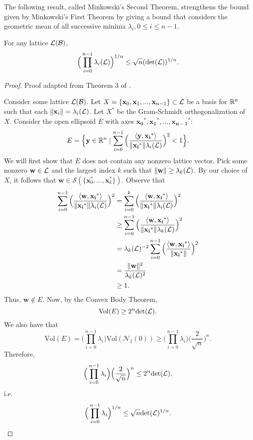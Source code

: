 \documentclass[a4paper,12pt]{article}
\begin{document}
The following result, called Minkowski's Second Theorem, strengthens the bound given by Minkowski's First Theorem by giving a bound that considers the geometric mean of all successive minima $\lambda_i, 0\leq i\leq n-1$.

\begin{thm}
    For any lattice $\mathcal{L}(\mathcal{B})$, $$\Big(\prod_{i=0}^{n-1}\lambda_{i}(\mathcal{L})\Big)^{1/n} \leq \sqrt{n}(\text{det}(\mathcal{L}))^{1/n}.$$
\end{thm}

\begin{proof}
    Proof adapted from Theorem 3 of \cite{RegevIntro}.
    
    Consider some lattice $\mathcal{L}(\mathcal{B})$. Let $X = \lbrace\mathbf{x}_0, \mathbf{x}_1, ..., \mathbf{x}_{n-1}\rbrace \subset \mathcal{L}$ be a basis for $\mathbb{R}^n$ such that each $\|\mathbf{x}_{i}\| = \lambda_{i}(\mathcal{L})$. Let $X^*$ be the Gram-Schmidt orthogonalization of $X$. Consider the open ellipsoid $E$ with axes $\mathbf{x_0}^{*}, \mathbf{x_1}^{*}, ..., \mathbf{x_{n-1}}^{*}$: $$E = \Big\lbrace \mathbf{y} \in \mathbb{R}^n \mid \sum_{i=0}^{n-1}\Big(\frac{\langle\mathbf{y},\mathbf{x_i}^*\rangle}{\|\mathbf{x_i}^{*}\|\lambda_{i}(\mathcal{L})}\Big)^{2} < 1  \Big\rbrace.$$
    We will first show that $E$ does not contain any nonzero lattice vector. Pick some nonzero $\mathbf{w} \in \mathcal{L}$ and the largest index $k$ such that $\|\mathbf{w}\| \geq \lambda_{k}(\mathcal{L})$. By our choice of $X$, it follows that $\mathbf{w} \in \mathcal{S}(\lbrace\mathbf{x}_{0}^{*},...,\mathbf{x}_{k}^{*}\rbrace)$. Observe that \begin{align*}
        \sum_{i=0}^{n-1}\Big(\frac{\langle\mathbf{w},\mathbf{x_i}^*\rangle}{\|\mathbf{x_i}^{*}\|\lambda_{i}(\mathcal{L})}\Big)^{2} &= \sum_{i=0}^{k}\Big(\frac{\langle\mathbf{w},\mathbf{x_i}^*\rangle}{\|\mathbf{x_i}^{*}\|\lambda_{i}(\mathcal{L})}\Big)^{2} \\
        &\geq \sum_{i=0}^{n-1}\Big(\frac{\langle\mathbf{w},\mathbf{x_i}^*\rangle}{\|\mathbf{x_i}^{*}\|\lambda_{k}(\mathcal{L})}\Big)^{2} \\ 
        &= \lambda_{k}(\mathcal{L})^{-2}\sum_{i=0}^{n-1}\Big(\frac{\langle\mathbf{w},\mathbf{x_i}^*\rangle}{\|\mathbf{x_i}^{*}\|}\Big)^{2} \\
        &= \frac{\|\mathbf{w}\|^{2}}{\lambda_{k}(\mathcal{L})^{2}} \\
        &\geq 1.
    \end{align*}
    Thus, $\mathbf{w} \notin E$. Now, by the Convex Body Theorem, $$\text{Vol}(E) \geq 2^{n}\text{det}(\mathcal{L}).$$ We also have that $$\text{Vol}(E) = \Big(\prod_{i=0}^{n-1}\lambda_{i}\Big)\text{Vol}(\mathcal{N}_{1}(0)) \geq \Big(\prod_{i=0}^{n-1}\lambda_{i}\Big)\Big(\frac{2}{\sqrt{n}}\Big)^{n}.$$ Therefore, $$\Big(\prod_{i=0}^{n-1}\lambda_{i}\Big)\Big(\frac{2}{\sqrt{n}}\Big)^{n} \leq 2^{n}\text{det}(\mathcal{L}),$$ i.e. $$\Big(\prod_{i=0}^{n-1}\lambda_{i}\Big)^{1/n} \leq \sqrt{n}\text{det}(\mathcal{L})^{1/n}.$$
\end{proof}
\end{document}
